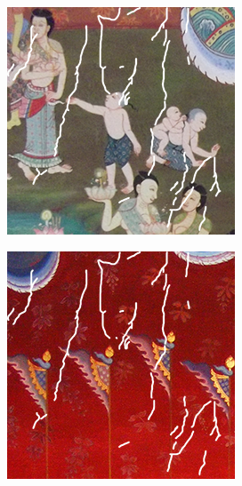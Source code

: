 \documentclass[xcolor=dvipsnames, xetex,serif]{beamer}
\numberwithin{equation}{section}
\begin{document}
\begin{frame}
\begin{figure}[H]
\begin{subfigure}{0.15\linewidth}
            \end{subfigure}
            \begin{subfigure}{0.15\linewidth}
                \centering
                \includegraphics[width=0.9\linewidth]{images/thaiart/case02-toinpaint.png}
            \end{subfigure}
            \begin{subfigure}{0.15\linewidth}
                \centering
                \includegraphics[width=0.9\linewidth]{images/thaiart/case03-toinpaint.png}			

\end{subfigure}
\end{figure}
\end{frame}
\end{document}
